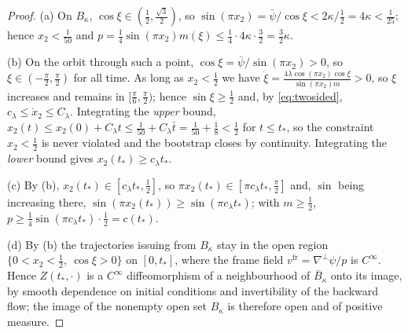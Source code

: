 \documentclass[11pt]{amsart}
\theoremstyle{definition}
\begin{document}
\begin{proof}
(a) On $B_\kappa$, $\cos\xi\in(\tfrac12,\tfrac{\sqrt3}{2})$, so
$\sin(\pi x_2)=\bar\psi/\cos\xi<2\kappa/\tfrac12=4\kappa<\tfrac1{25}$;
hence $x_2<\tfrac1{50}$ and
$p=\tfrac14\sin(\pi x_2)m(\xi)\le\tfrac14\cdot4\kappa\cdot\tfrac32
=\tfrac32\kappa$.

(b) On the orbit through such a point, $\cos\xi=\bar\psi/\sin(\pi
x_2)>0$, so $\xi\in(-\tfrac\pi2,\tfrac\pi2)$ for all time. As long as
$x_2<\tfrac12$ we have $\dot\xi=\tfrac{4\lambda\cos(\pi
x_2)\cos\xi}{\sin(\pi x_2)m}>0$, so $\xi$ increases and remains in
$[\tfrac\pi6,\tfrac\pi2)$; hence $\sin\xi\ge\tfrac12$ and, by
\eqref{eq:twosided}, $c_\lambda\le\dot x_2\le C_\lambda$. Integrating
the \emph{upper} bound, $x_2(t)\le
x_2(0)+C_\lambda t\le\tfrac1{50}+C_\lambda\bar t=\tfrac1{50}
+\tfrac18<\tfrac12$ for $t\le t_*$, so the constraint $x_2<\tfrac12$
is never violated and the bootstrap closes by continuity. Integrating
the \emph{lower} bound gives $x_2(t_*)\ge c_\lambda t_*$.

(c) By (b), $x_2(t_*)\in[c_\lambda t_*,\tfrac12]$, so $\pi
x_2(t_*)\in[\pi c_\lambda t_*,\tfrac\pi2]$ and, $\sin$ being
increasing there, $\sin(\pi x_2(t_*))\ge\sin(\pi c_\lambda t_*)$;
with $m\ge\tfrac12$, $p\ge\tfrac14\sin(\pi c_\lambda
t_*)\cdot\tfrac12=c(t_*)$.

(d) By (b) the trajectories issuing from $B_\kappa$ stay in the open
region $\{0<x_2<\tfrac12,\ \cos\xi>0\}$ on $[0,t_*]$, where the frame
field $v^{\mathrm{fr}}=\nabla^\perp\psi/p$ is $C^\infty$. Hence
$Z(t_*,\cdot)$ is a $C^\infty$ diffeomorphism of a neighbourhood of
$\bar B_\kappa$ onto its image, by smooth dependence on initial
conditions and invertibility of the backward flow; the image of the
nonempty open set $B_\kappa$ is therefore open and of positive
measure.
\end{proof}
\end{document}
